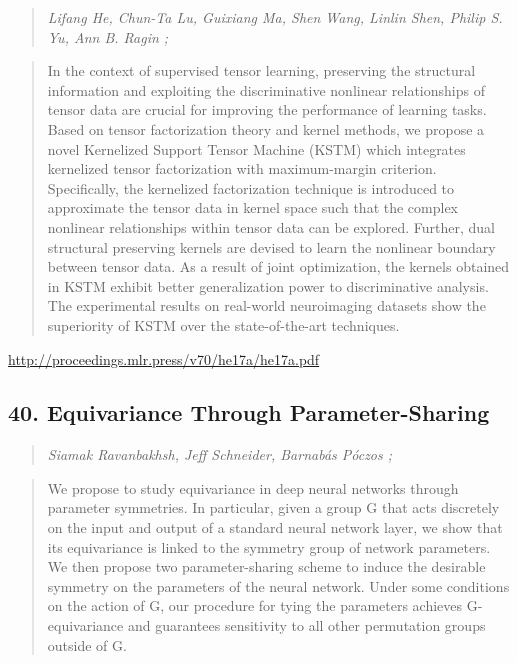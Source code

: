 \documentclass{article}
\begin{document}
\begin{quote}
\footnotesize{\textit{Lifang He, Chun-Ta Lu, Guixiang Ma, Shen Wang, Linlin Shen, Philip S. Yu, Ann B. Ragin ;}}

\end{quote}

\begin{quote}
    In the context of supervised tensor learning, preserving the structural information and exploiting the discriminative nonlinear relationships of tensor data are crucial for improving the performance of learning tasks. Based on tensor factorization theory and kernel methods, we propose a novel Kernelized Support Tensor Machine (KSTM) which integrates kernelized tensor factorization with maximum-margin criterion. Specifically, the kernelized factorization technique is introduced to approximate the tensor data in kernel space such that the complex nonlinear relationships within tensor data can be explored. Further, dual structural preserving kernels are devised to learn the nonlinear boundary between tensor data. As a result of joint optimization, the kernels obtained in KSTM exhibit better generalization power to discriminative analysis. The experimental results on real-world neuroimaging datasets show the superiority of KSTM over the state-of-the-art techniques.  
\end{quote}

\href{http://proceedings.mlr.press/v70/he17a/he17a.pdf}{http://proceedings.mlr.press/v70/he17a/he17a.pdf}

\subsection{40. Equivariance Through Parameter-Sharing}

\begin{quote}
\footnotesize{\textit{Siamak Ravanbakhsh, Jeff Schneider, Barnabás Póczos ;}}

\end{quote}

\begin{quote}
    We propose to study equivariance in deep neural networks through parameter symmetries. In particular, given a group G that acts discretely on the input and output of a standard neural network layer, we show that its equivariance is linked to the symmetry group of network parameters. We then propose two parameter-sharing scheme to induce the desirable symmetry on the parameters of the neural network. Under some conditions on the action of G, our procedure for tying the parameters achieves G-equivariance and guarantees sensitivity to all other permutation groups outside of G.  
\end{quote}
\end{document}
